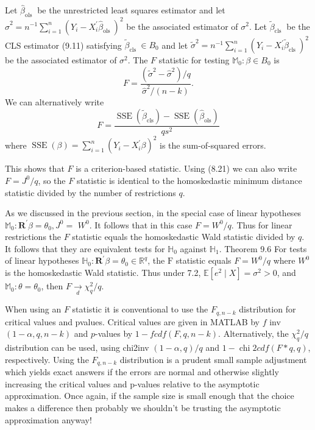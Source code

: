 \documentclass[10pt]{article}
\begin{document}
Let $\widehat{\beta}_{\text {ols }}$ be the unrestricted least squares estimator and let $\widehat{\sigma}^{2}=n^{-1} \sum_{i=1}^{n}\left(Y_{i}-X_{i}^{\prime} \widehat{\beta}_{\text {ols }}\right)^{2}$ be the associated estimator of $\sigma^{2}$. Let $\widetilde{\beta}_{\text {cls }}$ be the CLS estimator (9.11) satisfying $\widetilde{\beta}_{\text {cls }} \in B_{0}$ and let $\widetilde{\sigma}^{2}=n^{-1} \sum_{i=1}^{n}\left(Y_{i}-X_{i}^{\prime} \widetilde{\beta}_{\text {cls }}\right)^{2}$ be the associated estimator of $\sigma^{2}$. The $F$ statistic for testing $\mathbb{M}_{0}: \beta \in B_{0}$ is
$$
F=\frac{\left(\tilde{\sigma}^{2}-\widehat{\sigma}^{2}\right) / q}{\widehat{\sigma}^{2} /(n-k)} .
$$
We can alternatively write
$$
F=\frac{\operatorname{SSE}\left(\widetilde{\beta}_{\mathrm{cls}}\right)-\operatorname{SSE}\left(\widehat{\beta}_{\mathrm{ols}}\right)}{q s^{2}}
$$
where $\operatorname{SSE}(\beta)=\sum_{i=1}^{n}\left(Y_{i}-X_{i}^{\prime} \beta\right)^{2}$ is the sum-of-squared errors.

This shows that $F$ is a criterion-based statistic. Using (8.21) we can also write $F=J^{0} / q$, so the $F$ statistic is identical to the homoskedastic minimum distance statistic divided by the number of restrictions $q$.

As we discussed in the previous section, in the special case of linear hypotheses $\mathbb{M}_{0}: \boldsymbol{R}^{\prime} \beta=\theta_{0}, J^{0}=$ $W^{0}$. It follows that in this case $F=W^{0} / q$. Thus for linear restrictions the $F$ statistic equals the homoskedastic Wald statistic divided by $q$. It follows that they are equivalent tests for $\mathbb{H}_{0}$ against $\mathbb{H}_{1}$. Theorem 9.6 For tests of linear hypotheses $\mathbb{H}_{0}: \boldsymbol{R}^{\prime} \beta=\theta_{0} \in \mathbb{R}^{q}$, the $\mathrm{F}$ statistic equals $F=W^{0} / q$ where $W^{0}$ is the homoskedastic Wald statistic. Thus under 7.2, $\mathbb{E}\left[e^{2} \mid X\right]=\sigma^{2}>0$, and $\mathbb{M}_{0}: \theta=\theta_{0}$, then $F \underset{d}{\longrightarrow} \chi_{q}^{2} / q$.

When using an $F$ statistic it is conventional to use the $F_{q, n-k}$ distribution for critical values and pvalues. Critical values are given in MATLAB by $f$ inv $(1-\alpha, q, n-k)$ and $p$-values by $1-f c d f(F, q, n-k)$. Alternatively, the $\chi_{q}^{2} / q$ distribution can be used, using chi2inv $(1-\alpha, q) / q$ and $1-\operatorname{chi} 2 c d f(F * q, q)$, respectively. Using the $F_{q, n-k}$ distribution is a prudent small sample adjustment which yields exact answers if the errors are normal and otherwise slightly increasing the critical values and p-values relative to the asymptotic approximation. Once again, if the sample size is small enough that the choice makes a difference then probably we shouldn't be trusting the asymptotic approximation anyway!
\end{document}
